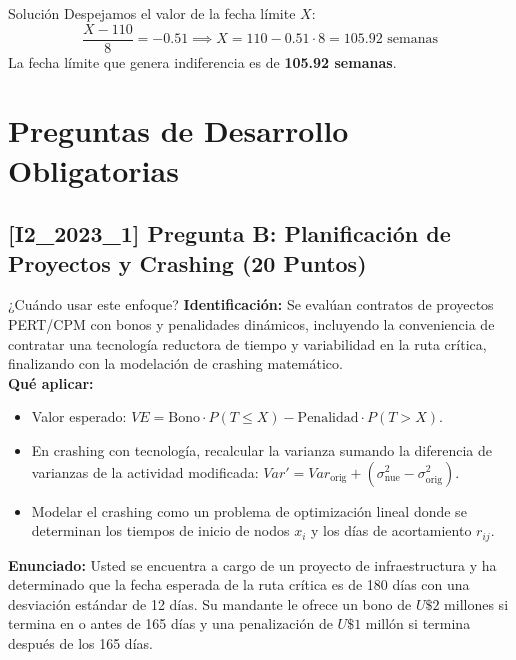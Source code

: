 \documentclass[11pt, a4paper]{article}
\begin{document}
\begin{ejercicio}{Solución}
  Despejamos el valor de la fecha límite $X$:
  \begin{equation*}
    \frac{X - 110}{8} = -0.51 \implies X = 110 - 0.51 \cdot 8 = 105.92 \text{ semanas}
  \end{equation*}
  La fecha límite que genera indiferencia es de \textbf{105.92 semanas}.

\end{ejercicio}

\newpage

\section{Preguntas de Desarrollo Obligatorias}

\newpage

\subsection*{[I2_2023_1] Pregunta B: Planificación de Proyectos y Crashing (20 Puntos)}
\begin{tipprueba}{¿Cuándo usar este enfoque?}
    \textbf{Identificación:} Se evalúan contratos de proyectos PERT/CPM con bonos y penalidades dinámicos, incluyendo la conveniencia de contratar una tecnología reductora de tiempo y variabilidad en la ruta crítica, finalizando con la modelación de crashing matemático.\\
    \textbf{Qué aplicar:}
    \begin{itemize}
      \item Valor esperado: $VE = \text{Bono} \cdot P(T \le X) - \text{Penalidad} \cdot P(T > X)$.
      \item En crashing con tecnología, recalcular la varianza sumando la diferencia de varianzas de la actividad modificada: $Var' = Var_{\text{orig}} + (\sigma_{\text{nue}}^2 - \sigma_{\text{orig}}^2)$.
      \item Modelar el crashing como un problema de optimización lineal donde se determinan los tiempos de inicio de nodos $x_i$ y los días de acortamiento $r_{ij}$.
    \end{itemize}
  \end{tipprueba}

  \textbf{Enunciado:}
  Usted se encuentra a cargo de un proyecto de infraestructura y ha determinado que la fecha esperada de la ruta crítica es de 180 días con una desviación estándar de 12 días. Su mandante le ofrece un bono de $U\$2$ millones si termina en o antes de 165 días y una penalización de $U\$1$ millón si termina después de los 165 días.
\end{document}
